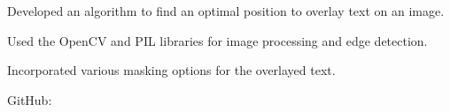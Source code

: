 \begin{resume_list}
  \item Developed an algorithm to find an optimal position to overlay text on an image.
  \item Used the OpenCV and PIL libraries for image processing and edge detection.
  \item Incorporated various masking options for the overlayed text.
  \item GitHub: 
\end{resume_list}
